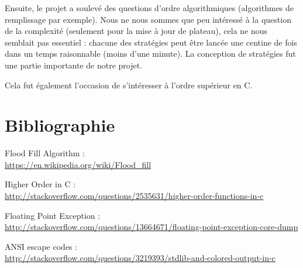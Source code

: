 \documentclass[12pt]{article}
\def\sec#1{\section{#1}}
\begin{document}
Ensuite, le projet a soulevé des questions d'ordre algorithmiques (algorithmes de remplissage par exemple). Nous ne nous sommes que peu intéressé à la question de la complexité (seulement pour la mise à jour de plateau), cela ne nous semblait pas essentiel : chacune des stratégies peut être lancée une centine de fois dans un temps raisonnable (moins d'une minute). La conception de stratégies fut une partie importante de notre projet.

Cela fut également l'occasion de s'intéresser à l'ordre supérieur en C.



\sec{Bibliographie}

Flood Fill Algorithm : \\ \url{https://en.wikipedia.org/wiki/Flood_fill}

Higher Order in C : \\ \url{http://stackoverflow.com/questions/2535631/higher-order-functions-in-c}

Floating Point Exception : \\ \url{http://stackoverflow.com/questions/13664671/floating-point-exception-core-dump}

ANSI escape codes : \\ \url{http://stackoverflow.com/questions/3219393/stdlib-and-colored-output-in-c}
\end{document}

